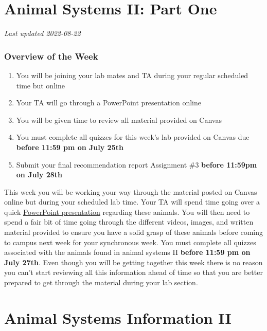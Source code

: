 \documentclass[
]{book}
\providecommand{\tightlist}{%
  \setlength{\itemsep}{0pt}\setlength{\parskip}{0pt}}
\begin{document}
\hypertarget{animal-systems-ii-part-one}{%
\chapter*{Animal Systems II: Part One}\label{animal-systems-ii-part-one}}

\emph{Last updated 2022-08-22}

\hypertarget{overview-of-the-week-2}{%
\subsection*{Overview of the Week}\label{overview-of-the-week-2}}

\begin{enumerate}
\def\labelenumi{\arabic{enumi}.}
\tightlist
\item
  You will be joining your lab mates and TA during your regular scheduled time but online
\item
  Your TA will go through a PowerPoint presentation online
\item
  You will be given time to review all material provided on Canvas
\item
  You must complete all quizzes for this week's lab provided on Canvas due \textbf{before 11:59 pm on July 25th}
\item
  Submit your final recommendation report Assignment \#3 \textbf{before 11:59pm on July 28th}
\end{enumerate}

This week you will be working your way through the material posted on Canvas online but during your scheduled lab time. Your TA will spend time going over a quick \href{https://osf.io/download/cf6tb}{PowerPoint presentation} regarding these animals. You will then need to spend a fair bit of time going through the different videos, images, and written material provided to ensure you have a solid grasp of these animals before coming to campus next week for your synchronous week. You must complete all quizzes associated with the animals found in animal systems II \textbf{before 11:59 pm on July 27th}. Even though you will be getting together this week there is no reason you can't start reviewing all this information ahead of time so that you are better prepared to get through the material during your lab section.

\hypertarget{animal-systems-information-ii}{%
\chapter*{Animal Systems Information II}\label{animal-systems-information-ii}}
\end{document}
